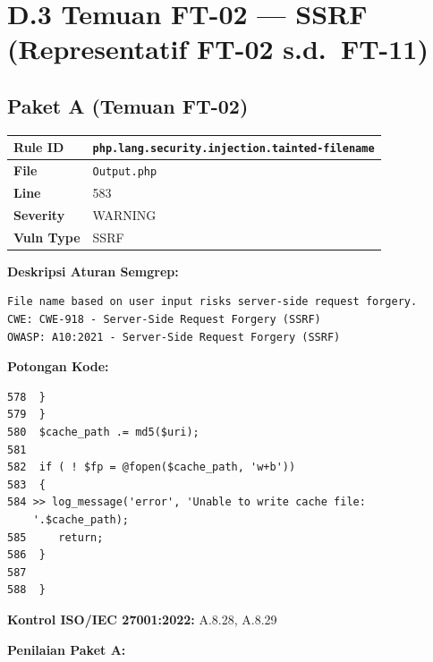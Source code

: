 \section*{D.3 Temuan FT-02 --- SSRF (Representatif FT-02 s.d.\ FT-11)}

\subsection*{Paket A (Temuan FT-02)}

\begin{center}
\renewcommand{\arraystretch}{1.3}
\begin{tabular}{|l|l|}
\hline
\textbf{Rule ID} &
  \texttt{php.lang.security.injection.tainted-filename} \\
\hline
\textbf{File} & \texttt{Output.php} \\
\hline
\textbf{Line} & 583 \\
\hline
\textbf{Severity} & WARNING \\
\hline
\textbf{Vuln Type} & SSRF \\
\hline
\end{tabular}
\end{center}

\textbf{Deskripsi Aturan Semgrep:}
\begin{small}
\begin{lstlisting}[style=promptstyle]
File name based on user input risks server-side request forgery.
CWE: CWE-918 - Server-Side Request Forgery (SSRF)
OWASP: A10:2021 - Server-Side Request Forgery (SSRF)
\end{lstlisting}
\end{small}

\textbf{Potongan Kode:}
\begin{small}
\begin{lstlisting}[style=promptstyle]
578  }
579  }
580  $cache_path .= md5($uri);
581
582  if ( ! $fp = @fopen($cache_path, 'w+b'))
583  {
584 >> log_message('error', 'Unable to write cache file: 
    '.$cache_path);
585     return;
586  }
587
588  }
\end{lstlisting}
\end{small}

\textbf{Kontrol ISO/IEC 27001:2022:} A.8.28, A.8.29

\textbf{Penilaian Paket A:}


